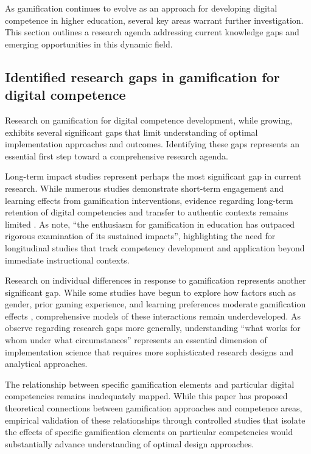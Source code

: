 \documentclass[cte]{acnsart}
\begin{document}
As gamification continues to evolve as an approach for developing digital competence in higher education, several key areas warrant further investigation. This section outlines a research agenda addressing current knowledge gaps and emerging opportunities in this dynamic field.

\subsection{Identified research gaps in gamification for digital competence}

Research on gamification for digital competence development, while growing, exhibits several significant gaps that limit understanding of optimal implementation approaches and outcomes. Identifying these gaps represents an essential first step toward a comprehensive research agenda.

Long-term impact studies represent perhaps the most significant gap in current research. While numerous studies demonstrate short-term engagement and learning effects from gamification interventions, evidence regarding long-term retention of digital competencies and transfer to authentic contexts remains limited \cite{Adams2022119}. As \citet{Prieto-Andreu2024244} note, ``the enthusiasm for gamification in education has outpaced rigorous examination of its sustained impacts'', highlighting the need for longitudinal studies that track competency development and application beyond immediate instructional contexts.

Research on individual differences in response to gamification represents another significant gap. While some studies have begun to explore how factors such as gender, prior gaming experience, and learning preferences moderate gamification effects \cite{Ho2024139}, comprehensive models of these interactions remain underdeveloped. As \citet{Nyanchoka2020} observe regarding research gaps more generally, understanding ``what works for whom under what circumstances'' represents an essential dimension of implementation science that requires more sophisticated research designs and analytical approaches.

The relationship between specific gamification elements and particular digital competencies remains inadequately mapped. While this paper has proposed theoretical connections between gamification approaches and competence areas, empirical validation of these relationships through controlled studies that isolate the effects of specific gamification elements on particular competencies would substantially advance understanding of optimal design approaches.
\end{document}
